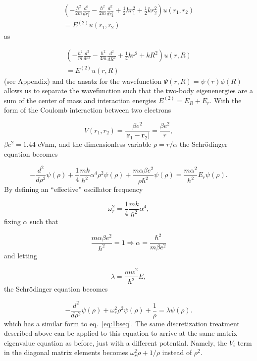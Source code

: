 \documentclass[10pt,showpacs,preprintnumbers,footinbib,amsmath,amssymb,aps,prl,twocolumn,groupedaddress,superscriptaddress,showkeys]{revtex4-1}
\begin{document}
{\begin{align*}
\left(  -\frac{\hbar^2}{2 m} \frac{d^2}{dr_1^2} -\frac{\hbar^2}{2 m} \frac{d^2}{dr_2^2}+ \frac{1}{2}k r_1^2+ \frac{1}{2}k r_2^2\right)u(r_1,r_2) \\
 = E^{(2)} u(r_1,r_2)
\end{align*}
as

\begin{align*}
\left(  -\frac{\hbar^2}{m} \frac{d^2}{dr^2} -\frac{\hbar^2}{4 m} \frac{d^2}{dR^2}+ \frac{1}{4} k r^2+  kR^2\right)u(r,R)\\
= E^{(2)} u(r,R)
\end{align*}
(see Appendix) and the ansatz for the wavefunction $\Psi(r,R) = \psi(r) \phi(R)$
allows us to separate the wavefunction such that the two-body eigenenergies
are a sum of the center of mass and interaction energies $E ^{(2)} = E _R + E_r$.
With the form of the Coulomb interaction between two electrons

\begin{equation*}
V(r_1,r_2) = \frac{\beta e^2}{|\mathbf{r}_1-\mathbf{r}_2|}=\frac{\beta e^2}{r},
\end{equation*}
 $\beta e^2=1.44$ eVnm, and the dimensionless variable $\rho = r/\alpha$ the
Schr\"{o}dinger equation becomes

\begin{equation*}
  -\frac{d^2}{d\rho^2} \psi(\rho) 
       + \frac{1}{4}\frac{mk}{\hbar^2} \alpha^4\rho^2\psi(\rho)+\frac{m\alpha \beta e^2}{\rho\hbar^2}\psi(\rho)  = 
\frac{m\alpha^2}{\hbar^2}E_r \psi(\rho) .
\end{equation*}
By defining an ``effective'' oscillator frequency

\begin{equation*}
\omega_r^2=\frac{1}{4}\frac{mk}{\hbar^2} \alpha^4,
\end{equation*}
fixing $\alpha$ such that

\begin{equation*}
\frac{m\alpha \beta e^2}{\hbar^2}=1 \Rightarrow \alpha = \frac{\hbar^2}{m\beta e^2}
\end{equation*}
and letting

\begin{equation*}
\lambda = \frac{m\alpha^2}{\hbar^2}E,
\end{equation*}
the Schr\"{o}dinger equation becomes

\begin{equation*}
  -\frac{d^2}{d\rho^2} \psi(\rho) + \omega_r^2\rho^2\psi(\rho) +\frac{1}{\rho} = \lambda \psi(\rho).
\end{equation*}
which has a similar form to eq.~\ref{eq:1bseq}. The same discretization treatment
described above can be applied to this equation to arrive at the same matrix
eigenvalue equation as before, just with a different potential. Namely, the
$V_i$ term in the diagonal matrix elements becomes $\omega_r ^2 \rho + 1/\rho$
instead of $\rho ^2$.



}
\end{document}
